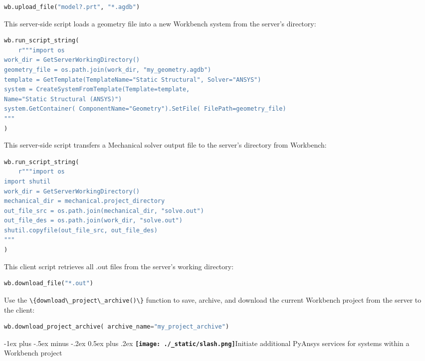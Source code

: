 \documentclass[
  9pt,
  landscape]{article}
\makeatletter
\newcommand{\passthrough}[1]{#1}
\renewcommand{\section}{\@startsection{section}{1}{0mm}%
                                {-1ex plus -.5ex minus -.2ex}%
                                {0.5ex plus .2ex}%
                                {\normalfont\Large\bfseries\texttt{[image: ./\_static/slash.png]}\hspace{0.3em}}}
\makeatother
\begin{document}
\begin{multicols}{3}
\begin{lstlisting}[language=Python]
wb.upload_file("model?.prt", "*.agdb")
\end{lstlisting}

This server-side script loads a geometry file into a new Workbench
system from the server's directory:

\begin{lstlisting}[language=Python]
wb.run_script_string(
    r"""import os
work_dir = GetServerWorkingDirectory()
geometry_file = os.path.join(work_dir, "my_geometry.agdb")
template = GetTemplate(TemplateName="Static Structural", Solver="ANSYS")
system = CreateSystemFromTemplate(Template=template,
Name="Static Structural (ANSYS)")
system.GetContainer( ComponentName="Geometry").SetFile( FilePath=geometry_file)
"""
)
\end{lstlisting}

This server-side script transfers a Mechanical solver output file to the
server's directory from Workbench:

\begin{lstlisting}[language=Python]
wb.run_script_string(
    r"""import os
import shutil
work_dir = GetServerWorkingDirectory()
mechanical_dir = mechanical.project_directory
out_file_src = os.path.join(mechanical_dir, "solve.out")
out_file_des = os.path.join(work_dir, "solve.out")
shutil.copyfile(out_file_src, out_file_des)
"""
)
\end{lstlisting}

This client script retrieves all .out files from the server's working
directory:

\begin{lstlisting}[language=Python]
wb.download_file("*.out")
\end{lstlisting}

Use the \passthrough{\lstinline!\{download\_project\_archive()\}!}
function to save, archive, and download the current Workbench project
from the server to the client:

\begin{lstlisting}[language=Python]
wb.download_project_archive( archive_name="my_project_archive")
\end{lstlisting}

\section{Initiate additional PyAnsys services for systems within a
Workbench
project}\label{initiate-additional-pyansys-services-for-systems-within-a-workbench-project}


\end{multicols}
\end{document}
